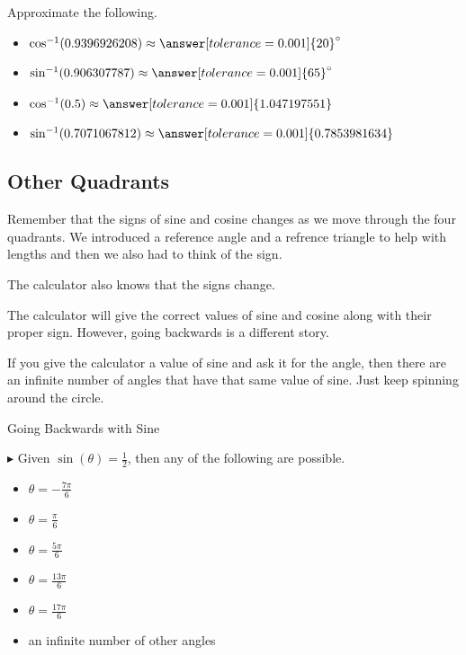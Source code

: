 \documentclass{ximera}
\begin{document}
\begin{question} 

Approximate the following.

\begin{itemize}
\item $\cos^{-1}(0.9396926208) \approx \answer[tolerance=0.001]{20}^{\circ}$
\item $\sin^{-1}(0.906307787) \approx \answer[tolerance=0.001]{65}^{\circ}$
\item $\cos^{-1}(0.5) \approx \answer[tolerance=0.001]{1.047197551}$
\item $\sin^{-1}(0.7071067812) \approx \answer[tolerance=0.001]{0.7853981634}$
\end{itemize}

\end{question}




\subsection*{Other Quadrants}

Remember that the signs of sine and cosine changes as we move through the four quadrants.  We introduced a reference angle and a refrence triangle to help with lengths and then we also had to think of the sign. 

The calculator also knows that the signs change. 

The calculator will give the correct values of sine and cosine along with their proper sign.  However, going backwards is a different story. 

If you give the calculator a value of sine and ask it for the angle, then there are an infinite number of angles that have that same value of sine.  Just keep spinning around the circle. 



\begin{example} Going Backwards with Sine

$\blacktriangleright$ Given  $\sin(\theta) = \frac{1}{2}$, then any of the following are possible.


\begin{itemize}
\item $\theta = -\frac{7\pi}{6}$
\item $\theta = \frac{\pi}{6}$
\item $\theta = \frac{5\pi}{6}$
\item $\theta = \frac{13\pi}{6}$
\item $\theta = \frac{17\pi}{6}$
\item an infinite number of other angles
\end{itemize}


\end{example}
\end{document}
